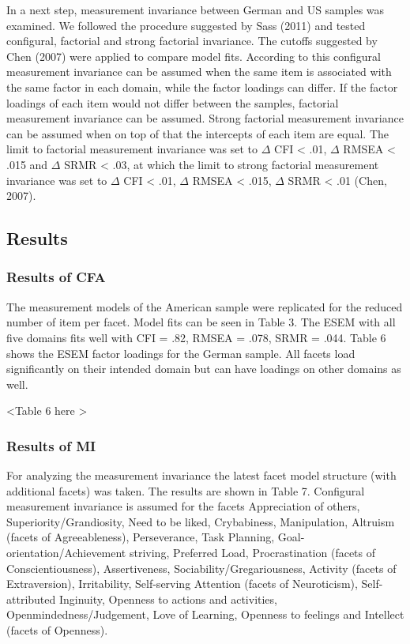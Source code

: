 \documentclass[man]{apa6}
\theoremstyle{definition}
\theoremstyle{definition}
\theoremstyle{definition}
\theoremstyle{remark}
\begin{document}
In a next step, measurement invariance between German and US samples was
examined. We followed the procedure suggested by Sass (2011) and tested
configural, factorial and strong factorial invariance. The cutoffs
suggested by Chen (2007) were applied to compare model fits. According
to this configural measurement invariance can be assumed when the same
item is associated with the same factor in each domain, while the factor
loadings can differ. If the factor loadings of each item would not
differ between the samples, factorial measurement invariance can be
assumed. Strong factorial measurement invariance can be assumed when on
top of that the intercepts of each item are equal. The limit to
factorial measurement invariance was set to \(\Delta\) CFI \textless{}
.01, \(\Delta\) RMSEA \textless{} .015 and \(\Delta\) SRMR \textless{}
.03, at which the limit to strong factorial measurement invariance was
set to \(\Delta\) CFI \textless{} .01, \(\Delta\) RMSEA \textless{}
.015, \(\Delta\) SRMR \textless{} .01 (Chen, 2007).

\hypertarget{results-1}{%
\subsection{Results}\label{results-1}}

\hypertarget{results-of-cfa}{%
\subsubsection{Results of CFA}\label{results-of-cfa}}

The measurement models of the American sample were replicated for the
reduced number of item per facet. Model fits can be seen in Table 3. The
ESEM with all five domains fits well with CFI = .82, RMSEA = .078, SRMR
= .044. Table 6 shows the ESEM factor loadings for the German sample.
All facets load significantly on their intended domain but can have
loadings on other domains as well.

\textless{}Table 6 here \textgreater{}

\hypertarget{results-of-mi}{%
\subsubsection{Results of MI}\label{results-of-mi}}

For analyzing the measurement invariance the latest facet model
structure (with additional facets) was taken. The results are shown in
Table 7. Configural measurement invariance is assumed for the facets
Appreciation of others, Superiority/Grandiosity, Need to be liked,
Crybabiness, Manipulation, Altruism (facets of Agreeableness),
Perseverance, Task Planning, Goal-orientation/Achievement striving,
Preferred Load, Procrastination (facets of Conscientiousness),
Assertiveness, Sociability/Gregariousness, Activity (facets of
Extraversion), Irritability, Self-serving Attention (facets of
Neuroticism), Self-attributed Inginuity, Openness to actions and
activities, Openmindedness/Judgement, Love of Learning, Openness to
feelings and Intellect (facets of Openness).
\end{document}
